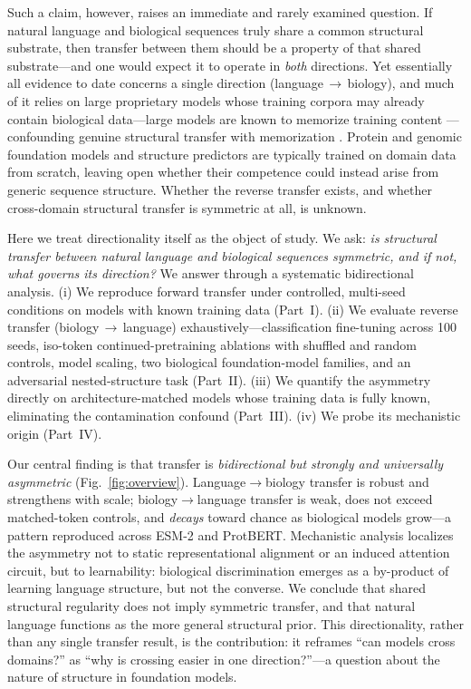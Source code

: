 \documentclass[11pt]{article}
\begin{document}
Such a claim, however, raises an immediate and rarely examined question. If natural language and
biological sequences truly share a common structural substrate, then transfer between them should
be a property of that shared substrate---and one would expect it to operate in \emph{both}
directions. Yet essentially all evidence to date concerns a single direction
(language\,$\rightarrow$\,biology), and much of it relies on large proprietary models whose
training corpora may already contain biological data---large models are known to memorize training
content \cite{carlini2021extracting}---confounding genuine structural transfer with
memorization \cite{lin2023,elnaggar2021}. Protein and genomic foundation models
\cite{rives2021esm,lin2023esm2,brandes2022proteinbert,madani2023progen,ji2021dnabert,nguyen2023hyenadna}
and structure predictors \cite{jumper2021alphafold} are typically trained on domain data from
scratch, leaving open whether their competence could instead arise from generic sequence structure.
Whether the reverse transfer exists, and whether
cross-domain structural transfer is symmetric at all, is unknown.

Here we treat directionality itself as the object of study. We ask: \emph{is structural transfer
between natural language and biological sequences symmetric, and if not, what governs its
direction?} We answer through a systematic bidirectional analysis. (i) We reproduce forward
transfer under controlled, multi-seed conditions on models with known training data (Part~I). (ii) We evaluate reverse
transfer (biology\,$\rightarrow$\,language) exhaustively---classification fine-tuning across 100
seeds, iso-token continued-pretraining ablations with shuffled and random controls, model
scaling, two biological foundation-model families, and an adversarial nested-structure task
(Part~II). (iii) We quantify the asymmetry directly on architecture-matched models whose training
data is fully known, eliminating the contamination confound (Part~III). (iv) We probe its
mechanistic origin (Part~IV).

Our central finding is that transfer is \emph{bidirectional but strongly and universally
asymmetric} (Fig.~\ref{fig:overview}). Language$\rightarrow$biology transfer is robust and
strengthens with scale; biology$\rightarrow$language transfer is weak, does not exceed
matched-token controls, and \emph{decays} toward chance as biological models grow---a pattern
reproduced across ESM-2 and ProtBERT. Mechanistic analysis localizes the asymmetry not to static
representational alignment or an induced attention circuit, but to learnability: biological
discrimination emerges as a by-product of learning language structure, but not the converse. We
conclude that shared structural
regularity does not imply symmetric transfer, and that natural language functions as the more
general structural prior. This directionality, rather than any single transfer result, is the
contribution: it reframes ``can models cross domains?'' as ``why is crossing easier in one
direction?''---a question about the nature of structure in foundation models.
\end{document}
